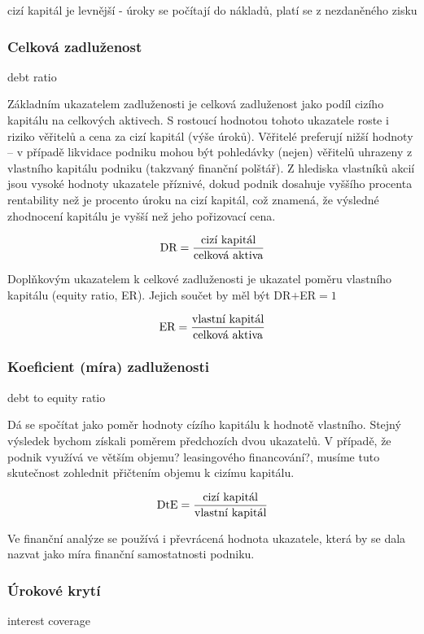 cizí kapitál je levnější - úroky se počítají do nákladů, platí se z nezdaněného zisku

\subsubsection{Celková zadluženost}
debt ratio

Základním ukazatelem zadluženosti je celková zadluženost jako podíl cizího kapitálu na celkových aktivech. S rostoucí hodnotou tohoto ukazatele roste i riziko věřitelů a cena za cizí kapitál (výše úroků). Věřitelé preferují nižší hodnoty -- v případě likvidace podniku mohou být pohledávky (nejen) věřitelů uhrazeny z vlastního kapitálu podniku (takzvaný finanční polštář).
Z hlediska vlastníků akcií jsou vysoké hodnoty ukazatele příznivé, dokud podnik dosahuje vyššího procenta rentability než je procento úroku na cizí kapitál, což znamená, že výsledné zhodnocení kapitálu je vyšší než jeho pořizovací cena\cite{such}. 

$$\text{DR} = \dfrac{\text{cizí kapitál}}{\text{celková aktiva}}$$

\vspace{3mm}
Doplňkovým ukazatelem k celkové zadluženosti je ukazatel poměru vlastního kapitálu (equity ratio, ER). Jejich součet by měl být DR$+$ER$=1$

$$\text{ER} = \dfrac{\text{vlastní kapitál}}{\text{celková aktiva}}$$

\subsubsection{Koeficient (míra) zadluženosti}
debt to equity ratio

Dá se spočítat jako poměr hodnoty cízího kapitálu k hodnotě vlastního. Stejný výsledek bychom získali poměrem předchozích dvou ukazatelů. V případě, že podnik využívá ve větším objemu? leasingového financování?, musíme tuto skutečnost zohlednit přičtením objemu k cizímu kapitálu. 

$$\text{DtE} = \dfrac{\text{cizí kapitál}}{\text{vlastní kapitál}}$$

\vspace{3mm}
Ve finanční analýze se používá i převrácená hodnota ukazatele, která by se dala nazvat jako míra finanční samostatnosti podniku.

\subsubsection{Úrokové krytí}
interest coverage


